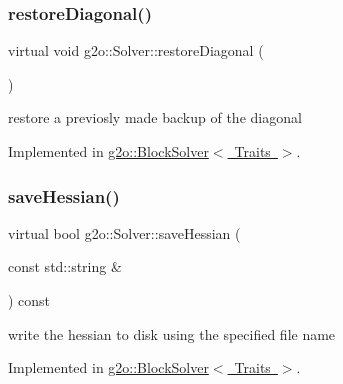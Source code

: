 \mbox{\label{classg2o_1_1_solver_a3c40dae9b999c4d18e57b02fd0e0ade2}} 
\subsubsection{\texorpdfstring{restore\+Diagonal()}{restoreDiagonal()}}
{\footnotesize\ttfamily virtual void g2o\+::\+Solver\+::restore\+Diagonal (\begin{DoxyParamCaption}{ }\end{DoxyParamCaption})\hspace{0.3cm}{\ttfamily [pure virtual]}}

restore a previosly made backup of the diagonal 

Implemented in \mbox{\hyperlink{classg2o_1_1_block_solver_a2136931d7aa2f54df5207556c4685809}{g2o\+::\+Block\+Solver$<$ Traits $>$}}.

\mbox{\label{classg2o_1_1_solver_a14852543c4dc3f3e7088efe03aa135eb}} 
\subsubsection{\texorpdfstring{save\+Hessian()}{saveHessian()}}
{\footnotesize\ttfamily virtual bool g2o\+::\+Solver\+::save\+Hessian (\begin{DoxyParamCaption}\item[{const std\+::string \&}]{ }\end{DoxyParamCaption}) const\hspace{0.3cm}{\ttfamily [pure virtual]}}



write the hessian to disk using the specified file name 



Implemented in \mbox{\hyperlink{classg2o_1_1_block_solver_a51563178d31f3eae6ec61993ea069a77}{g2o\+::\+Block\+Solver$<$ Traits $>$}}.

\mbox{\label{classg2o_1_1_solver_acc8d6a8ae7847a157d4a2f44aea14c74}} 
